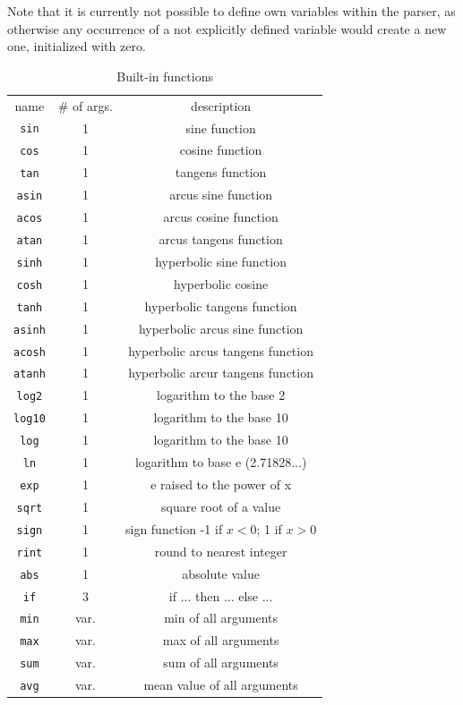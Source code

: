 Note that it is currently not possible to define own variables within
the parser, as otherwise any occurrence of a not explicitly defined
variable would create a new one, initialized with zero.
\begin{table}[ht]
  \begin{longtable}{c|c|c}
    \hline\noalign{\smallskip}
    name & \# of args. & description \\
    \noalign{\smallskip}\hline\noalign{\smallskip} 
    \verb#sin#     & 1 & sine function \\
    \verb#cos#     & 1 & cosine function \\
    \verb#tan#     & 1 & tangens function \\
    \verb#asin#    & 1 & arcus sine function \\
    \verb#acos#    & 1 & arcus cosine function \\
    \verb#atan#    & 1 & arcus tangens function \\
    \verb#sinh#    & 1 & hyperbolic sine function \\
    \verb#cosh#    & 1 & hyperbolic cosine \\
    \verb#tanh#    & 1 & hyperbolic tangens function \\
    \verb#asinh#   & 1 & hyperbolic arcus sine function \\
    \verb#acosh#   & 1 & hyperbolic arcus tangens function \\
    \verb#atanh#   & 1 & hyperbolic arcur tangens function \\
    \verb#log2#    & 1 & logarithm to the base 2 \\
    \verb#log10#   & 1 & logarithm to the base 10 \\
    \verb#log#     & 1 & logarithm to the base 10 \\
    \verb#ln#      & 1 & logarithm to base e (2.71828...) \\
    \verb#exp#     & 1 & e raised to the power of x \\
    \verb#sqrt#    & 1 & square root of a value \\
    \verb#sign#    & 1 & sign function -1 if $x<0$; 1 if $x>0$ \\
    \verb#rint#    & 1 & round to nearest integer \\
    \verb#abs#     & 1 & absolute value \\
    \verb#if#      & 3 & if ... then ... else ... \\
    \verb#min#     & var. & min of all arguments \\
    \verb#max#     & var. & max of all arguments \\
    \verb#sum#     & var. & sum of all arguments \\
    \verb#avg#     & var. & mean value of all arguments
  \end{longtable}
 \caption{Built-in functions}  
\end{table}

